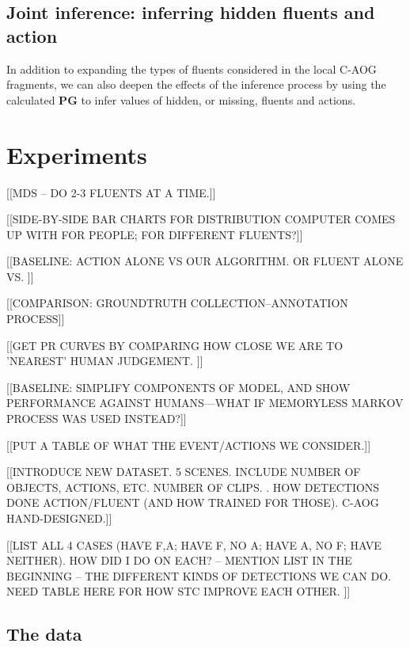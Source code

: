 \documentclass[10pt,journal,letterpaper,compsoc]{IEEEtran}
\begin{document}
\subsection{Joint inference: inferring hidden fluents and action}

In addition to expanding the types of fluents considered in the local C-AOG fragments, we can also deepen the effects of the inference process by using the calculated $\mathbf{PG}$ to infer values of hidden, or missing, fluents and actions.






\section{Experiments}
\label{sec:experiments}


[[MDS -- DO 2-3 FLUENTS AT A TIME.]]

[[SIDE-BY-SIDE BAR CHARTS FOR DISTRIBUTION COMPUTER COMES UP WITH FOR PEOPLE; FOR DIFFERENT FLUENTS?]]

[[BASELINE: ACTION ALONE VS OUR ALGORITHM.  OR FLUENT ALONE VS. ]]

[[COMPARISON: GROUNDTRUTH COLLECTION--ANNOTATION PROCESS]]

[[GET PR CURVES BY COMPARING HOW CLOSE WE ARE TO 'NEAREST' HUMAN JUDGEMENT. ]]

[[BASELINE: SIMPLIFY COMPONENTS OF MODEL, AND SHOW PERFORMANCE AGAINST HUMANS---WHAT IF MEMORYLESS MARKOV PROCESS WAS USED INSTEAD?]]



[[PUT A TABLE OF WHAT THE EVENT/ACTIONS WE CONSIDER.]]

[[INTRODUCE NEW DATASET.  5 SCENES.  INCLUDE NUMBER OF OBJECTS, ACTIONS, ETC. NUMBER OF CLIPS. . HOW DETECTIONS DONE ACTION/FLUENT (AND HOW TRAINED FOR THOSE). C-AOG HAND-DESIGNED.]]

[[LIST ALL 4 CASES (HAVE F,A; HAVE F, NO A; HAVE A, NO F; HAVE NEITHER).  HOW DID I DO ON EACH? -- MENTION LIST IN THE BEGINNING -- THE DIFFERENT KINDS OF DETECTIONS WE CAN DO.  NEED TABLE HERE FOR HOW STC IMPROVE EACH OTHER. ]]  





\subsection{The data}
\end{document}
